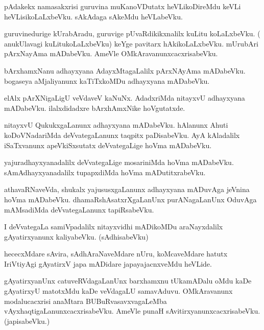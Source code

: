 \documentclass{article}
\begin{document}
\begin{mn}
pAdakekx namasakxrisi  guruvina muKanoVDutatx heVLikoDireMdu keVLi heVLisikoLaLxbeVku. sAkAdaga 
sAkeMdu heVLabeVku.
\end{mn}

\begin{mn}
guruvinedurige kUrabAradu, guruvige pUvaRdikikxnalilx kuLitu koLaLxbeVku. ( anukUlavagi 
kuLitukoLaLxbeVku) keYge pavitarx hAkikoLaLxbeVku. mUrubAri pArxNayAma mADabeVku. AmeVle 
OMkAravanunxcacxrisabeVku.
\end{mn}

\begin{mn}
bArxhamxNanu adhayxyana AdayxMtagaLalilx pArxNAyAma mADabeVku. bogaseya aMjaliyanunx kaTiTxkoMDu 
adhayxyana mADabeVku.
\end{mn}

\begin{mn}
elAlx pArXNigaLigU veVdaveV kaNuNx. AdadxriMda nitayxvU adhayxyana mADabeVku. ilalxdidadxre 
bArxhAmxNike hoVgutatxde.
\end{mn}

\begin{mn}
nitayxvU QukukxgaLanunx adhayxyana mADabeVku. hAlanunx Ahuti koDoVNadariMda deVvategaLanunx taqpitx
paDisabeVku. AyA kAladalilx iSaTxvanunx apeVkiSxsutatx deVvategaLige hoVma mADabeVku.
\end{mn}

\begin{mn}
yajuradhayxyanadalilx deVvategaLige mosariniMda hoVma mADabeVku. sAmAdhayxyanadalilx tupapxdiMda 
hoVma mADutitxrabeVku.
\end{mn}

\begin{mn}
athavaRNaveVda, shukalx yajususxgaLanunx adhayxyana mADuvAga jeVnina hoVma mADabeVku. 
dhamaRshAsatxrXgaLanUnx  purANagaLanUnx OduvAga mAMsadiMda deVvategaLanunx tapiRsabeVku.
\end{mn}

\begin{mn}
I deVvategaLa samiVpadalilx nitayxvidhi mADikoMDu araNayxdalilx gAyatirxyanunx kaliyabeVku.
(sAdhisabeVku)
\end{mn}

\begin{mn}
hececxMdare sAvira, sAdhAraNaveMdare nUru, koMcaveMdare hatutx IriVtiyAgi gAyatirxV japa mADidare
japayajacnxveMdu heVLide.
\end{mn}

\begin{mn}
gAyatirxyanUnx catuveRVdagaLanUnx barxhamxnu tUkamADalu oMdu kaDe gAyatirxyU matotxMdu kaDe 
veVdagaLU samavAduvu. OMkAravanunx modalucacxrisi anaMtara BUBuRvasavxvagaLeMba 
vAyxhaqtigaLanunxcacxrisabeVku. AmeVle punaH sAvitirxyanunxcacxrisabeVku. (japisabeVku.)
\end{mn}
\end{document}
